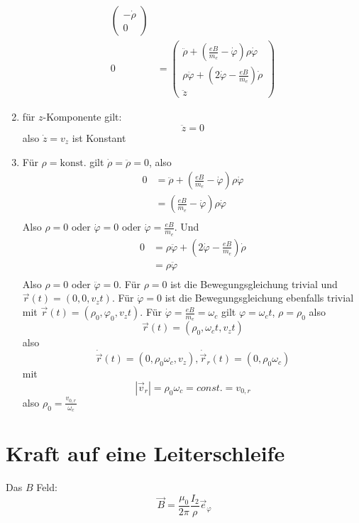 \documentclass[sectionformat=aufgabe]{gadsescript}
\begin{document}
\begin{enumerate}[label=\alph*)]
\begin{align*}
\begin{pmatrix}
			       - \dot \rho \\
			       0
		       \end{pmatrix}\\%
		       0 &= %
		       \begin{pmatrix} 
			       \ddot \rho + \left( \frac{eB}{ m_e } - \dot \varphi  \right)  \rho \dot \varphi \\
			       \rho \ddot \varphi + \left( 2 \dot \varphi - \frac{eB}{ m_e } \right) \dot \rho \\
			       \ddot z
		       \end{pmatrix} 
		\end{align*}
	\item für $ z $-Komponente gilt:
		\[
			\ddot z = 0
		\]
		also $ \dot z = v_z $ ist Konstant
	\item Für $ \rho = \text{konst.}  $ gilt $ \dot \rho = \ddot \rho = 0 $, also
		\begin{align*}
		       0 &= %
		       \ddot \rho + \left( \frac{eB}{ m_e } - \dot \varphi  \right)  \rho \dot \varphi \\
			 &= \left( \frac{eB}{ m_e } - \dot \varphi  \right)  \rho \dot \varphi \\
		\end{align*}
		Also $ \rho = 0 $ oder $ \dot \varphi = 0 $ oder $ \dot \varphi = \frac{ eB }{ m_e }  $.
		Und
		\begin{align*}
		       0 &= \rho \ddot \varphi + \left( 2 \dot \varphi - \frac{eB}{ m_e } \right) \dot \rho \\
		         &= \rho \ddot \varphi \\
		\end{align*}
		Also $ \rho = 0 $ oder $ \ddot \varphi = 0 $.
		Für $ \rho = 0 $ ist die Bewegungsgleichung trivial und $ \vec r (t) = \left( 0, 0, v_z t \right) $.
		Für $ \dot \varphi = 0 $ ist die Bewegungsgleichung ebenfalls trivial mit $ \vec r(t) = \left( \rho_0, \varphi_0, v_z t \right)  $.
		Für $ \dot \varphi = \frac{ eB }{ m_e } = \omega_c $ gilt $ \varphi = \omega_c t $, $ \rho = \rho_0 $ also
		\[
			\vec r(t) = \left( \rho_0, \omega_c t, v_z t \right)
		\]
		also
		\[
			\dot {\vec r}(t) =
			\left( 0, \rho_0 \omega_c, v_z \right) ,
			\dot {\vec r}_r(t) =
			\left( 0, \rho_0 \omega_c \right)
		\]
		mit
		\[
			\left| \vec v_r \right| = \rho_0 \omega_c = const. = v_{0, r} 
		\]
		also $ \rho_0 = \frac{ v_{0, r}  }{ \omega_c }  $
\end{enumerate}

\section{Kraft auf eine Leiterschleife}
Das $ B $ Feld:
\[
	\vec B = \frac{ \mu_0 }{ 2 \pi  } \frac{ I_2 }{ \rho } \vec e_{\varphi} 
\]
\end{document}
